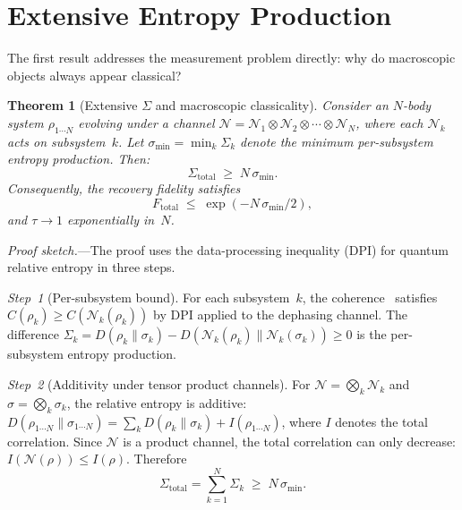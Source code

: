 \documentclass[prl,twocolumn,superscriptaddress,longbibliography,floatfix]{revtex4-2}
\newtheorem{theorem}{Theorem}
\newcommand{\chan}{\mathcal{N}}
\newcommand{\tauasym}{\tau}
\begin{document}
\section{Extensive Entropy Production}
\label{sec:extensive}

The first result addresses the measurement problem directly: why do
macroscopic objects always appear classical?

\begin{theorem}[Extensive $\Sigma$ and macroscopic classicality]
\label{thm:extensive}
Consider an $N$-body system $\rho_{1\cdots N}$ evolving under a
channel $\chan = \chan_1 \otimes \chan_2 \otimes \cdots \otimes
\chan_N$, where each $\chan_k$ acts on subsystem~$k$.  Let
$\sigma_{\min} = \min_k \Sigma_k$ denote the minimum per-subsystem
entropy production.  Then:
\begin{equation}
\Sigma_{\mathrm{total}} \;\geq\; N\,\sigma_{\min}.
\label{eq:extensive}
\end{equation}
Consequently, the recovery fidelity satisfies
\begin{equation}
F_{\mathrm{total}} \;\leq\; \exp(-N\,\sigma_{\min}/2),
\label{eq:F_extensive}
\end{equation}
and $\tauasym \to 1$ exponentially in~$N$.
\end{theorem}

\emph{Proof sketch.}---The proof uses the data-processing inequality
(DPI) for quantum relative entropy in three steps.

\emph{Step~1} (Per-subsystem bound).  For each subsystem~$k$, the
coherence~\cite{BaumgratzCP2014} satisfies
$C(\rho_k) \geq C(\chan_k(\rho_k))$ by DPI applied to the
dephasing channel.  The difference
$\Sigma_k = D(\rho_k\|\sigma_k) - D(\chan_k(\rho_k)\|\chan_k(\sigma_k))
\geq 0$ is the per-subsystem entropy production.

\emph{Step~2} (Additivity under tensor product channels).
For $\chan = \bigotimes_k \chan_k$ and
$\sigma = \bigotimes_k \sigma_k$, the relative entropy is additive:
$D(\rho_{1\cdots N}\|\sigma_{1\cdots N})
= \sum_k D(\rho_k\|\sigma_k) + I(\rho_{1\cdots N})$,
where $I$ denotes the total correlation.  Since
$\chan$ is a product channel, the total correlation can only
decrease: $I(\chan(\rho)) \leq I(\rho)$.  Therefore
\begin{equation}
\Sigma_{\mathrm{total}} = \sum_{k=1}^{N} \Sigma_k
\;\geq\; N\,\sigma_{\min}.
\label{eq:sigma_sum}
\end{equation}
\end{document}
